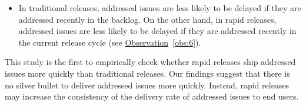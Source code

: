 \begin{itemize}
	\item In traditional releases, addressed issues are less likely to be
		delayed if they are addressed recently in the backlog. On the
		other hand, in rapid releases, addressed issues are less likely
		to be delayed if they are addressed recently in the current
		release cycle (see \hyperref[obs:6]{Observation}~\ref{obs:6}). 
%
%
%		
%

\end{itemize}

This study is the first to empirically check whether rapid releases ship
addressed issues more quickly than traditional releases. Our findings suggest
that there is no silver bullet to deliver addressed issues more quickly.
Instead, rapid releases may increase the consistency of the delivery rate of
addressed issues to end users.

